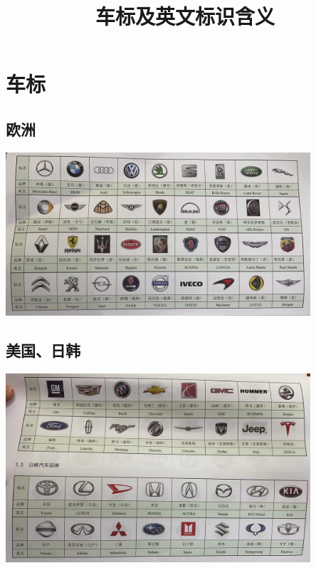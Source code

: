 
\graphicspath{{../img/}}
\title{车标及英文标识含义}
\author{}
\date{}

\setlength{\parskip}{0em}	%
\setlength{\parindent}{2em} %
\setlength{\baselineskip}{20pt}	%
\selectfont	%
\setlength{\lineskip}{10pt}		%
\setlength{\lineskiplimit}{10pt}	%
\abovedisplayshortskip=0pt	%
\belowdisplayshortskip=0pt
\abovedisplayskip=0pt	%
\belowdisplayskip=0pt
\renewcommand{\arraystretch}{1.5}

\maketitle
\section{车标}
\subsection{欧洲}
	\begin{center}
		\includegraphics[width=0.85\textwidth]{6-1}
	\end{center}
\subsection{美国、日韩}
	\begin{center}
		\includegraphics[width=0.85\textwidth]{6-2}
	\end{center}
